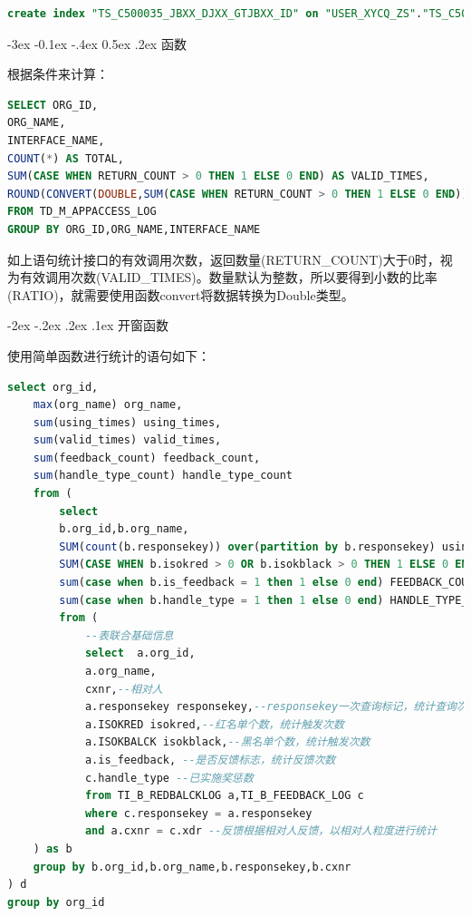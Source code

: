\documentclass[12pt]{book}
\makeatletter
\numberwithin{dummy}{section}
\theoremstyle{ocrenumbox}
\theoremstyle{blacknumex}
\theoremstyle{blacknumbox}
\theoremstyle{ocrenum}
\renewcommand{\subsection}{\@startsection {subsection}{2}{\z@}
	{-3ex \@plus -0.1ex \@minus -.4ex}
	{0.5ex \@plus.2ex }
	{\normalfont\sffamily\bfseries}}
\renewcommand\paragraph{\@startsection{paragraph}{4}{\z@}
	{-2ex \@plus-.2ex \@minus .2ex}
	{.1ex}
	{\normalfont\small\sffamily\bfseries}}
\newlength\esp
\makeatother
\begin{document}
\begin{lstlisting}[language=SQL]
create index "TS_C500035_JBXX_DJXX_GTJBXX_ID" on "USER_XYCQ_ZS"."TS_C500035_JBXX_DJXX_GTJBXX"("ID") storage(initial 1,next 1,minextents 1);
\end{lstlisting}

\subsection{函数}

根据条件来计算：

\begin{lstlisting}[language=SQL]
SELECT ORG_ID,
ORG_NAME,
INTERFACE_NAME,
COUNT(*) AS TOTAL,
SUM(CASE WHEN RETURN_COUNT > 0 THEN 1 ELSE 0 END) AS VALID_TIMES,
ROUND(CONVERT(DOUBLE,SUM(CASE WHEN RETURN_COUNT > 0 THEN 1 ELSE 0 END))/CONVERT(DOUBLE,COUNT(*)),3) AS RATIO
FROM TD_M_APPACCESS_LOG
GROUP BY ORG_ID,ORG_NAME,INTERFACE_NAME
\end{lstlisting}

如上语句统计接口的有效调用次数，返回数量(RETURN\_COUNT)大于0时，视为有效调用次数(VALID\_TIMES)。数量默认为整数，所以要得到小数的比率(RATIO)，就需要使用函数convert将数据转换为Double类型。

\paragraph{开窗函数}

使用简单函数进行统计的语句如下：

\begin{lstlisting}[language=SQL]
select org_id,
	max(org_name) org_name,
	sum(using_times) using_times,
	sum(valid_times) valid_times,
	sum(feedback_count) feedback_count,
	sum(handle_type_count) handle_type_count
	from (
		select 
		b.org_id,b.org_name,
		SUM(count(b.responsekey)) over(partition by b.responsekey) using_times,--使用次数
		SUM(CASE WHEN b.isokred > 0 OR b.isokblack > 0 THEN 1 ELSE 0 END) AS VALID_TIMES,--触发反馈次数
		sum(case when b.is_feedback = 1 then 1 else 0 end) FEEDBACK_COUNT, --反馈次数
		sum(case when b.handle_type = 1 then 1 else 0 end) HANDLE_TYPE_COUNT --已实施奖惩次数
		from (
			--表联合基础信息
			select  a.org_id,
			a.org_name,
			cxnr,--相对人
			a.responsekey responsekey,--responsekey一次查询标记，统计查询次数
			a.ISOKRED isokred,--红名单个数，统计触发次数
			a.ISOKBALCK isokblack,--黑名单个数，统计触发次数
			a.is_feedback, --是否反馈标志，统计反馈次数
			c.handle_type --已实施奖惩数
			from TI_B_REDBALCKLOG a,TI_B_FEEDBACK_LOG c
			where c.responsekey = a.responsekey
			and a.cxnr = c.xdr --反馈根据相对人反馈，以相对人粒度进行统计
	) as b
	group by b.org_id,b.org_name,b.responsekey,b.cxnr
) d
group by org_id
\end{lstlisting}
\end{document}
